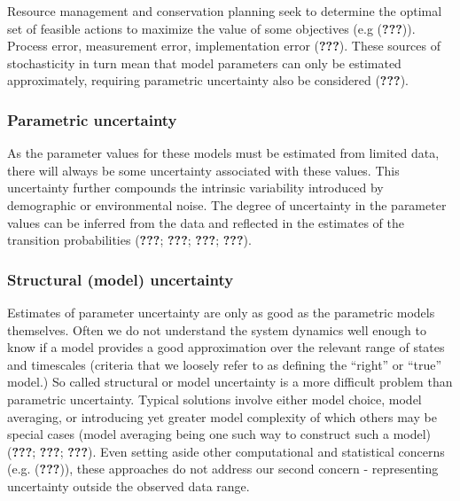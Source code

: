 \documentclass[author-year, review]{elsarticle} %
\begin{document}
Resource management and conservation planning seek to determine the
optimal set of feasible actions to maximize the value of some objectives
(e.g ({\textbf{???}})). Process error, measurement error, implementation
error ({\textbf{???}}). These sources of stochasticity in turn mean that
model parameters can only be estimated approximately, requiring
parametric uncertainty also be considered ({\textbf{???}}).

\subsubsection{Parametric uncertainty}\label{parametric-uncertainty}

As the parameter values for these models must be estimated from limited
data, there will always be some uncertainty associated with these
values. This uncertainty further compounds the intrinsic variability
introduced by demographic or environmental noise. The degree of
uncertainty in the parameter values can be inferred from the data and
reflected in the estimates of the transition probabilities
({\textbf{???}}; {\textbf{???}}; {\textbf{???}}; {\textbf{???}}).

\subsubsection{Structural (model)
uncertainty}\label{structural-model-uncertainty}

Estimates of parameter uncertainty are only as good as the parametric
models themselves. Often we do not understand the system dynamics well
enough to know if a model provides a good approximation over the
relevant range of states and timescales (criteria that we loosely refer
to as defining the ``right'' or ``true'' model.) So called structural or
model uncertainty is a more difficult problem than parametric
uncertainty. Typical solutions involve either model choice, model
averaging, or introducing yet greater model complexity of which others
may be special cases (model averaging being one such way to construct
such a model) ({\textbf{???}}; {\textbf{???}}; {\textbf{???}}). Even
setting aside other computational and statistical concerns (e.g.
({\textbf{???}})), these approaches do not address our second concern -
representing uncertainty outside the observed data range.
\end{document}
